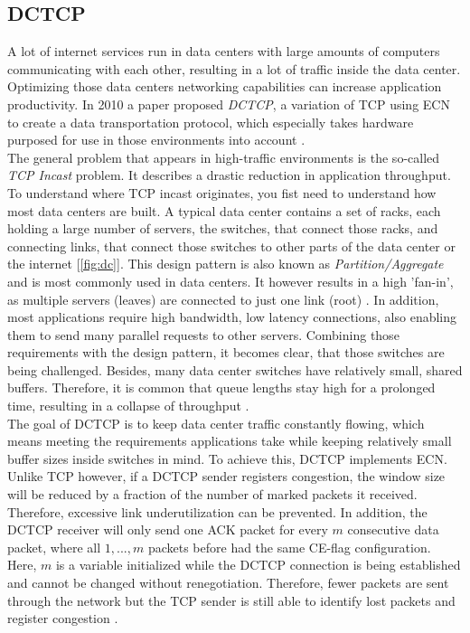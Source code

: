 \documentclass[a4paper,conference]{IEEEtran}
\begin{document}
\subsection{DCTCP}
\label{sec:DCTCP}
A lot of internet services run in data centers with large amounts of computers communicating with each other, resulting in a lot of traffic inside the data center. Optimizing those data centers networking capabilities can increase application productivity. In 2010 a paper proposed \textit{DCTCP}, a variation of TCP using ECN to create a data transportation protocol, which especially takes hardware purposed for use in those environments into account \cite{10.1145/1851275.1851192}.\\
The general problem that appears in high-traffic environments is the so-called \textit{TCP Incast} problem. It describes a drastic reduction in application throughput. To understand where TCP incast originates, you fist need to understand how most data centers are built. A typical data center contains a set of racks, each holding a large number of servers, the switches, that connect those racks, and connecting links, that connect those switches to other parts of the data center or the internet [\autoref{fig:dc}]. This design pattern is also known as \textit{Partition/Aggregate} and is most commonly used in data centers. It however results in a high 'fan-in', as multiple servers (leaves) are connected to just one link (root) \cite{10.1145/1851275.1851192,10.1145/1592681.1592693}. In addition, most applications require high bandwidth, low latency connections, also enabling them to send many parallel requests to other servers. Combining those requirements with the design pattern, it becomes clear, that those switches are being challenged. Besides, many data center switches have relatively small, shared buffers. Therefore, it is common that queue lengths stay high for a prolonged time, resulting in a collapse of throughput \cite{10.1145/1851275.1851192,10.1145/1592681.1592693}.\\
The goal of DCTCP is to keep data center traffic constantly flowing, which means meeting the requirements applications take while keeping relatively small buffer sizes inside switches in mind. To achieve this, DCTCP implements ECN. Unlike TCP however, if a DCTCP sender registers congestion, the window size will be reduced by a fraction of the number of marked packets it received. Therefore, excessive link underutilization can be prevented. In addition, the DCTCP receiver will only send one ACK packet for every $m$ consecutive data packet, where all $1,...,m$ packets before had the same CE-flag configuration. Here, $m$ is a variable initialized while the DCTCP connection is being established and cannot be changed without renegotiation. Therefore, fewer packets are sent through the network but the TCP sender is still able to identify lost packets and register congestion \cite{10.1145/1851275.1851192}.
\end{document}
